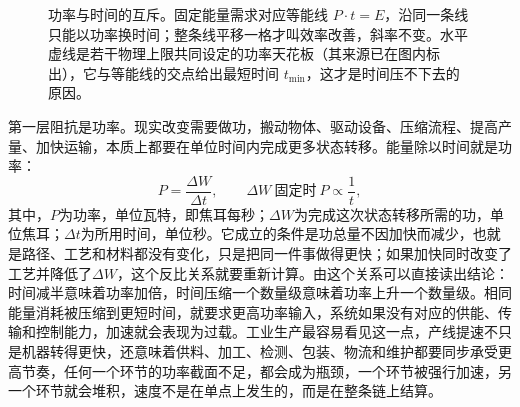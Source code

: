 \begin{figure}[ht]


\caption{功率与时间的互斥。固定能量需求对应等能线 $P\cdot t=E$，沿同一条线只能以功率换时间；整条线平移一格才叫效率改善，斜率不变。水平虚线是若干物理上限共同设定的功率天花板（其来源已在图内标出），它与等能线的交点给出最短时间 $t_{\min}$，这才是时间压不下去的原因。}
\label{fig:power-time}
\end{figure}



第一层阻抗是功率。现实改变需要做功，搬动物体、驱动设备、压缩流程、提高产量、加快运输，本质上都要在单位时间内完成更多状态转移。能量除以时间就是功率：
\begin{equation}
P=\frac{\Delta W}{\Delta t},\qquad \Delta W\ \text{固定时}\ P\propto\frac{1}{t},
\label{eq:power}
\end{equation}
其中，$P$为功率，单位瓦特，即焦耳每秒；$\Delta W$为完成这次状态转移所需的功，单位焦耳；$\Delta t$为所用时间，单位秒。它成立的条件是功总量不因加快而减少，也就是路径、工艺和材料都没有变化，只是把同一件事做得更快；如果加快同时改变了工艺并降低了$\Delta W$，这个反比关系就要重新计算。由这个关系可以直接读出结论：时间减半意味着功率加倍，时间压缩一个数量级意味着功率上升一个数量级。相同能量消耗被压缩到更短时间，就要求更高功率输入，系统如果没有对应的供能、传输和控制能力，加速就会表现为过载。工业生产最容易看见这一点，产线提速不只是机器转得更快，还意味着供料、加工、检测、包装、物流和维护都要同步承受更高节奏，任何一个环节的功率截面不足，都会成为瓶颈，一个环节被强行加速，另一个环节就会堆积，速度不是在单点上发生的，而是在整条链上结算。

